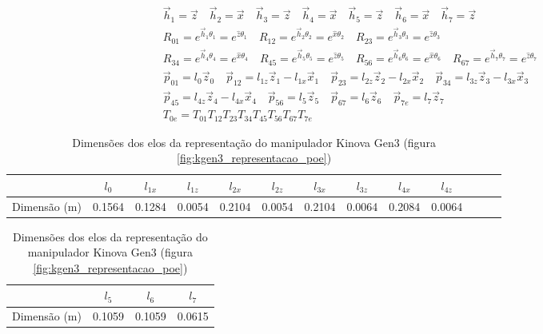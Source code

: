 \documentclass[a4paper,11pt]{article}
\theoremstyle{mytheor}
\begin{document}
\begin{gather*}
\vec{h}_1 = \vec{z} \quad
\vec{h}_2 = \vec{x} \quad
\vec{h}_3 = \vec{z} \quad
\vec{h}_4 = \vec{x} \quad
\vec{h}_5 = \vec{z} \quad
\vec{h}_6 = \vec{x} \quad
\vec{h}_7 = \vec{z}
\\
R_{01} = e^{\vec{h}_1\theta_1} = e^{\widehat{z}\theta_1} \quad
R_{12} = e^{\vec{h}_2\theta_2} = e^{\widehat{x}\theta_2} \quad
R_{23} = e^{\vec{h}_3\theta_3} = e^{\widehat{z}\theta_3} \\
R_{34} = e^{\vec{h}_4\theta_4} = e^{\widehat{x}\theta_4} \quad
R_{45} = e^{\vec{h}_5\theta_5} = e^{\widehat{z}\theta_5} \quad
R_{56} = e^{\vec{h}_6\theta_6} = e^{\widehat{x}\theta_6} \quad
R_{67} = e^{\vec{h}_7\theta_7} = e^{\widehat{z}\theta_7}
\\
\vec{p}_{01} = l_0\vec{z}_0 \quad
\vec{p}_{12} = l_{1z}\vec{z}_1 - l_{1x}\vec{x}_1 \quad
\vec{p}_{23} = l_{2z}\vec{z}_2 - l_{2x}\vec{x}_2 \quad
\vec{p}_{34} = l_{3z}\vec{z}_3 - l_{3x}\vec{x}_3 \\
\vec{p}_{45} = l_{4z}\vec{z}_4 - l_{4x}\vec{x}_4 \quad
\vec{p}_{56} = l_5\vec{z}_5 \quad
\vec{p}_{67} = l_6\vec{z}_6 \quad
\vec{p}_{7e} = l_7\vec{z}_7
\\
T_{0e} = T_{01}T_{12}T_{23}T_{34}T_{45}T_{56}T_{67}T_{7e}
\end{gather*}

\begin{table}[!ht]
\centering
\caption{Dimensões dos elos da representação do manipulador Kinova Gen3 (figura \ref{fig:kgen3_representacao_poe})}
\label{tab:kgen3_representacao_dim}

\begin{tabular}{|c|c|c|c|c|c|c|c|c|c|c|c|c|}
\hline
             & $l_0$ & $l_{1x}$ & $l_{1z}$ & $l_{2x}$ & $l_{2z}$ & $l_{3x}$ & $l_{3z}$ & $l_{4x}$ & $l_{4z}$ \\ \hline
Dimensão (m) & 0.1564 & 0.1284 & 0.0054 & 0.2104 & 0.0054 & 0.2104 & 0.0064 & 0.2084 & 0.0064  \\ \hline
\end{tabular}
\begin{tabular}{|c|c|c|c|}
\hline
             & $l_5$ & $l_6$ & $l_7$ \\ \hline
Dimensão (m) & 0.1059 & 0.1059 & 0.0615 \\ \hline
\end{tabular}
\end{table}
\end{document}
